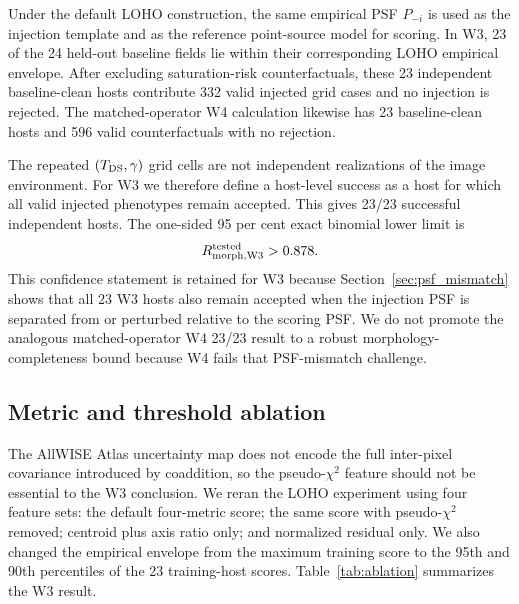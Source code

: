 \documentclass[fleqn,usenatbib]{mnras}
\begin{document}
Under the default LOHO construction, the same empirical PSF $P_{-i}$ is used as the injection template and as the reference point-source model for scoring. In W3, 23 of the 24 held-out baseline fields lie within their corresponding LOHO empirical envelope. After excluding saturation-risk counterfactuals, these 23 independent baseline-clean hosts contribute 332 valid injected grid cases and no injection is rejected. The matched-operator W4 calculation likewise has 23 baseline-clean hosts and 596 valid counterfactuals with no rejection.

The repeated $(T_{\rm DS},\gamma)$ grid cells are not independent realizations of the image environment. For W3 we therefore define a host-level success as a host for which all valid injected phenotypes remain accepted. This gives 23/23 successful independent hosts. The one-sided 95 per cent exact binomial lower limit is
\begin{equation}
R_{\rm morph,W3}^{\rm tested}>0.878.
\end{equation}
This confidence statement is retained for W3 because Section~\ref{sec:psf_mismatch} shows that all 23 W3 hosts also remain accepted when the injection PSF is separated from or perturbed relative to the scoring PSF. We do not promote the analogous matched-operator W4 23/23 result to a robust morphology-completeness bound because W4 fails that PSF-mismatch challenge.

\subsection{Metric and threshold ablation}
\label{sec:image_robustness}

The AllWISE Atlas uncertainty map does not encode the full inter-pixel covariance introduced by coaddition, so the pseudo-$\chi^2$ feature should not be essential to the W3 conclusion. We reran the LOHO experiment using four feature sets: the default four-metric score; the same score with pseudo-$\chi^2$ removed; centroid plus axis ratio only; and normalized residual only. We also changed the empirical envelope from the maximum training score to the 95th and 90th percentiles of the 23 training-host scores. Table~\ref{tab:ablation} summarizes the W3 result.
\end{document}
